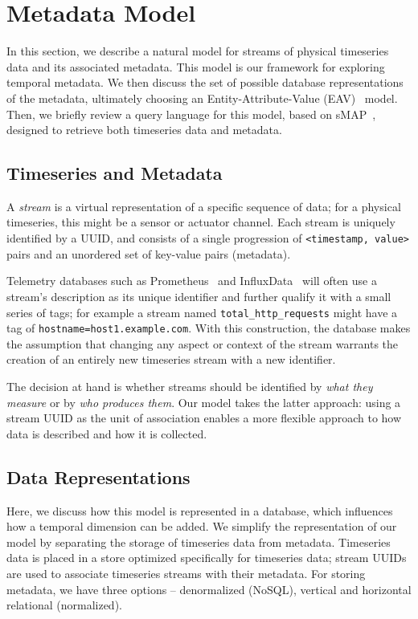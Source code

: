 \section{Metadata Model} \label{section:model}

In this section, we describe a natural model for streams of physical timeseries
data and its associated metadata. This model is our framework for exploring
temporal metadata. We then discuss the set of possible database representations
of the metadata, ultimately choosing an Entity-Attribute-Value
(EAV)~\cite{chen1976entity} model. Then, we briefly review a query language for
this model, based on sMAP~\cite{dawson2010smap}, designed to retrieve both
timeseries data and metadata.


\subsection{Timeseries and Metadata}

A \emph{stream} is a virtual representation of a specific sequence of data; for
a physical timeseries, this might be a sensor or actuator channel. Each stream
is uniquely identified by a UUID, and consists of a single progression of
\texttt{<timestamp, value>} pairs and an unordered set of key-value pairs
(metadata).

Telemetry databases such as Prometheus~\cite{prometheus} and
InfluxData~\cite{influxdata} will often use a stream's description as its
unique identifier and further qualify it with a small series of tags; for
example a stream named \texttt{total\_http\_requests} might have a tag of
\texttt{hostname=host1.example.com}. With this construction, the database makes
the assumption that changing any aspect or context of the stream warrants the
creation of an entirely new timeseries stream with a new identifier.

The decision at hand is whether streams should be identified by \emph{what they
measure} or by \emph{who produces them}. Our model takes the latter approach:
using a stream UUID as the unit of association enables a more flexible approach
to how data is described and how it is collected.

\subsection{Data Representations}

Here, we discuss how this model is represented in a database, which influences
how a temporal dimension can be added. We simplify the representation of our
model by separating the storage of timeseries data from metadata. Timeseries
data is placed in a store optimized specifically for timeseries data; stream
UUIDs are used to associate timeseries streams with their metadata. For
storing metadata, we have three options -- denormalized (NoSQL), vertical
and horizontal relational (normalized).

